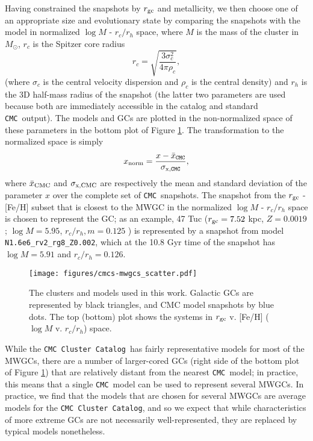 \documentclass[twocolumn]{aastex631}
\newcommand{\CMC}{\texttt{CMC}}
\newcommand{\CMCcat}{\texttt{CMC Cluster Catalog}}
\begin{document}
Having constrained the snapshots by $r_{\rm gc}$ and metallicity, we then choose one of an appropriate size and evolutionary state by comparing the snapshots with the model in normalized $\log M$ - $r_c / r_h$ space, where $M$ is the mass of the cluster in $M_\odot$, $r_c$ is the Spitzer core radius \citep{1987degc.book.....S}
\begin{equation}
    r_c = \sqrt{\frac{3 \sigma_c^2}{4 \pi \rho_c}},
\end{equation}
(where $\sigma_c$ is the central velocity dispersion and $\rho_c$ is the central density) and $r_h$ is the 3D half-mass radius of the snapshot (the latter two parameters are used because both are immediately accessible in the \citet{2018MNRAS.478.1520B} catalog and standard \CMC\ output).
The models and GCs are plotted in the non-normalized space of these parameters in the bottom plot of Figure \ref{fig:cmcs-mwgcs_scatter}.
The transformation to the normalized space is simply
\begin{equation}
    x_{\rm norm} = \frac{x - \bar{x}_{\rm \CMC}}{\sigma_{\rm x, \CMC}},
\end{equation}
where $\bar{x}_{\rm CMC}$ and $\sigma_{\rm x,CMC}$ are respectively the mean and standard deviation of the parameter $x$ over the complete set of \CMC\ snapshots.
The snapshot from the $r_{\rm gc}$ - [Fe/H] subset that is closest to the MWGC in the normalized $\log M$ - $r_c / r_h$ space is chosen to represent the GC; as an example, 47 Tuc ($r_{\rm gc} = 7.52$ kpc, $Z = 0.0019$; $\log M = 5.95$, $r_c / r_h,m = 0.125$ \citep{2018MNRAS.478.1520B, 2010arXiv1012.3224H}) is represented by a snapshot from model \texttt{N1.6e6\_rv2\_rg8\_Z0.002}, which at the 10.8 Gyr time of the snapshot has $\log M = 5.91$ and $r_c / r_h = 0.126$.

\begin{figure}
    \begin{centering}
        \texttt{[image: figures/cmcs-mwgcs\_scatter.pdf]}
        \caption{
        The clusters and models used in this work.
        Galactic GCs are represented by black triangles, and CMC model snapshots by blue dots.
        The top (bottom) plot shows the systems in $r_{\rm gc}$ v. [Fe/H] ($\log M$ v. $r_c / r_h$) space.
        }
        \label{fig:cmcs-mwgcs_scatter}
    \end{centering}
\end{figure}

While the \CMCcat\ has fairly representative models for most of the MWGCs, there are a number of larger-cored GCs (right side of the bottom plot of Figure \ref{fig:cmcs-mwgcs_scatter}) that are relatively distant from the nearest \CMC\ model; in practice, this means that a single \CMC\ model can be used to represent several MWGCs.
In practice, we find that the models that are chosen for several MWGCs are average models for the \CMCcat, and so we expect that while characteristics of more extreme GCs are not necessarily well-represented, they are replaced by typical models nonetheless.
\end{document}
